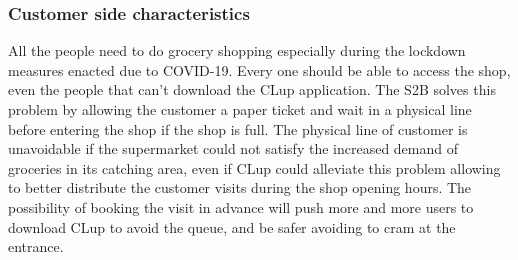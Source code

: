\subsubsection{Customer side characteristics}
All the people need to do grocery shopping especially during the lockdown measures enacted due to COVID-19.
Every one should be able to access the shop, even the people that can't download the CLup application.
The S2B solves this problem by allowing the customer a paper ticket and wait in a physical line before entering the shop if the shop is full.
The physical line of customer is unavoidable if the supermarket could not satisfy the increased demand of groceries in its catching area, even if CLup could alleviate this problem allowing to better distribute the customer visits during the shop opening hours. The possibility of booking the visit in advance will push more and more users to download CLup to avoid the queue, and be safer avoiding to cram at the entrance.


